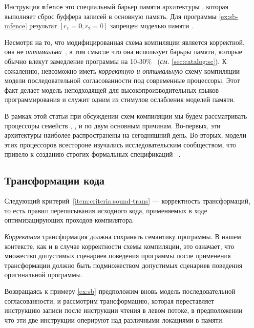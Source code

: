 Инструкция \texttt{mfence} это специальный барьер памяти 
архитектуры \Intel, которая выполняет сброс буффера записей в основную память. 
Для программы \ref{ex:sb-mfence} результат ${[r_1=0, r_2=0]}$
запрещен моделью памяти \Intel. 

Несмотря на то, что модифицированная схема компиляции является корректной, 
она не \emph{оптимальна}~\cite{OptimalCompilationCPP}, 
в том смысле что она использует барьры памяти,
которые обычно влекут замедление программы 
на 10-30\%~\cite{Marino-al:PLDI11, Liu-al:OOPSLA17}
(\emph{см.} \cref{sec:catalog:sc}).
К сожалению, невозможно иметь \emph{корректную и оптимальную} 
схему компиляции модели последовательной согласованности 
под современные процессоры. 
Этот факт делает модель \SC неподходящей 
для высокопроизводительных языков программирования 
и служит одним из стимулов ослабления моделей памяти. 

В рамках этой статьи при обсуждении 
схем компиляции мы будем рассматривать процессоры семейств
\Intel, ,  и \POWER 
по двум основным причинам. 
Во-первых, эти архитектуры наиболее 
распространены на сегодняшний день. 
Во-вторых, модели этих процессоров 
всестороне изучались исследовательским сообществом, 
что привело к созданию строгих 
формальных спецификаций~%
\cite{Sewell-al:CACM10, Sarkar-al:PLDI11, 
Flur-al:POPL16, Pulte-al:POPL18}. 

\subsection{Трансформации кода}
\label{sec:background:trans}

Следующий критерий~\ref{item:criteria:sound-trans} ---
корректность трансформаций, то есть правил переписывания 
исходного кода, применяемых в ходе оптимизацирующих проходов компилятора. 

\emph{Корректная} трансформация должна сохранять семантику программы. 
В нашем контексте, как и в случае корректности схемы компиляции,
это означает, что множество допустимых сценариев поведения 
программы после применения трансформации должно 
быть подмножеством допустимых сценариев поведения оригинальной программы.

Возвращаясь к примеру \ref{ex:sb}
предположим вновь модель последовательной согласованности, 
и рассмотрим трансформацию, которая переставляет
инструкцию записи после инструкции чтения в левом потоке, 
в предположении что эти две инструкции 
оперируют над различными локациями в памяти:

